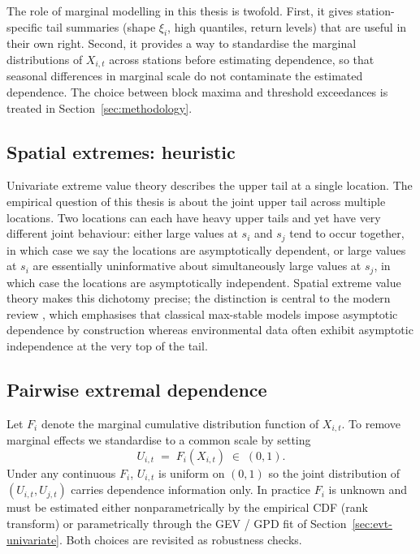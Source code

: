 The role of marginal modelling in this thesis is twofold. First, it
gives station-specific tail summaries (shape \(\xi_i\), high
quantiles, return levels) that are useful in their own right.
Second, it provides a way to standardise the marginal distributions
of \(X_{i,t}\) across stations before estimating dependence, so that
seasonal differences in marginal scale do not contaminate the
estimated dependence. The choice between block maxima and
threshold exceedances is treated in Section~\ref{sec:methodology}.

\subsection{Spatial extremes: heuristic}\label{sec:evt-spatial-heuristic}

Univariate extreme value theory describes the upper tail at a single
location. The empirical question of this thesis is about the joint
upper tail across multiple locations. Two locations can each have
heavy upper tails and yet have very different joint behaviour:
either large values at \(s_i\) and \(s_j\) tend to occur together,
in which case we say the locations are asymptotically dependent, or
large values at \(s_i\) are essentially uninformative about
simultaneously large values at \(s_j\), in which case the locations
are asymptotically independent. Spatial extreme value theory makes
this dichotomy precise; the distinction is central to the modern
review \citep{TODO-huser2020}, which emphasises that classical
max-stable models impose asymptotic dependence by construction
whereas environmental data often exhibit asymptotic independence at
the very top of the tail.

\subsection{Pairwise extremal dependence}\label{sec:evt-pairwise}

Let \(F_i\) denote the marginal cumulative distribution function of
\(X_{i,t}\). To remove marginal effects we standardise to a common
scale by setting
\[
    U_{i,t} \;=\; F_i(X_{i,t}) \;\in\; (0,1).
\]
Under any continuous \(F_i\), \(U_{i,t}\) is uniform on \((0,1)\) so
the joint distribution of \((U_{i,t},U_{j,t})\) carries dependence
information only. In practice \(F_i\) is unknown and must be
estimated either nonparametrically by the empirical CDF (rank
transform) or parametrically through the GEV / GPD fit of
Section~\ref{sec:evt-univariate}. Both choices are revisited as
robustness checks.

